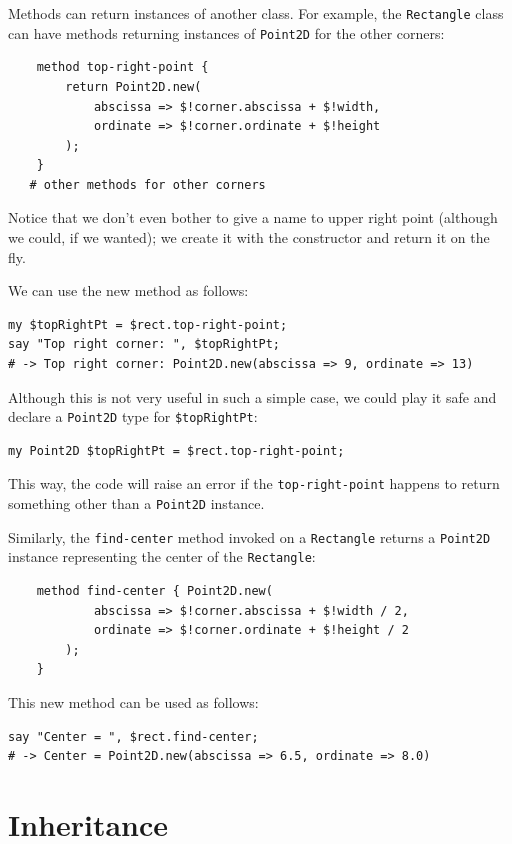 Methods can return instances of another class.  For example, 
the {\tt Rectangle} class can have methods returning 
instances of {\tt Point2D} for the other corners:

\begin{verbatim}
    method top-right-point {
        return Point2D.new(
            abscissa => $!corner.abscissa + $!width, 
            ordinate => $!corner.ordinate + $!height
        );
    }
   # other methods for other corners
\end{verbatim}

Notice that we don't even bother to give a name to upper right 
point (although we could, if we wanted); we create it with the 
constructor and return it on the fly.

We can use the new method as follows:

\begin{verbatim}
my $topRightPt = $rect.top-right-point;
say "Top right corner: ", $topRightPt;
# -> Top right corner: Point2D.new(abscissa => 9, ordinate => 13)
\end{verbatim}

Although this is not very useful in such a simple case, we 
could play it safe and declare a {\tt Point2D} type for 
\verb'$topRightPt':

\begin{verbatim}
my Point2D $topRightPt = $rect.top-right-point;
\end{verbatim} 

This way, the code will raise an error if the {\tt top-right-point} 
happens to return something other than a {\tt Point2D} instance.

Similarly, the \verb"find-center" method invoked on a 
{\tt Rectangle} returns a {\tt Point2D} instance 
representing the center of the {\tt Rectangle}:

\begin{verbatim}
    method find-center { Point2D.new(
            abscissa => $!corner.abscissa + $!width / 2, 
            ordinate => $!corner.ordinate + $!height / 2
        );
    }
\end{verbatim}
%
This new method can be used as follows:

\begin{verbatim}
say "Center = ", $rect.find-center;
# -> Center = Point2D.new(abscissa => 6.5, ordinate => 8.0)
\end{verbatim}
%

\section{Inheritance}


